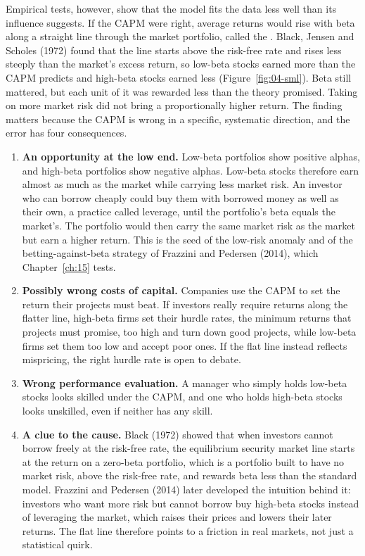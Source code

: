 Empirical tests, however, show that the model fits the data less well than its influence suggests. If the CAPM were right, average returns would rise with beta along a straight line through the market portfolio, called the . Black, Jensen and Scholes (1972) found that the line starts above the risk-free rate and rises less steeply than the market's excess return, so low-beta stocks earned more than the CAPM predicts and high-beta stocks earned less (Figure~\ref{fig:04-sml}). Beta still mattered, but each unit of it was rewarded less than the theory promised. Taking on more market risk did not bring a proportionally higher return. The finding matters because the CAPM is wrong in a specific, systematic direction, and the error has four consequences.

\begin{enumerate}
  \item \textbf{An opportunity at the low end.} Low-beta portfolios show positive alphas, and high-beta portfolios show negative alphas. Low-beta stocks therefore earn almost as much as the market while carrying less market risk. An investor who can borrow cheaply could buy them with borrowed money as well as their own, a practice called leverage, until the portfolio's beta equals the market's. The portfolio would then carry the same market risk as the market but earn a higher return. This is the seed of the low-risk anomaly and of the betting-against-beta strategy of Frazzini and Pedersen (2014), which Chapter~\ref{ch:15} tests.
  \item \textbf{Possibly wrong costs of capital.} Companies use the CAPM to set the return their projects must beat. If investors really require returns along the flatter line, high-beta firms set their hurdle rates, the minimum returns that projects must promise, too high and turn down good projects, while low-beta firms set them too low and accept poor ones. If the flat line instead reflects mispricing, the right hurdle rate is open to debate.
  \item \textbf{Wrong performance evaluation.} A manager who simply holds low-beta stocks looks skilled under the CAPM, and one who holds high-beta stocks looks unskilled, even if neither has any skill.
  \item \textbf{A clue to the cause.} Black (1972) showed that when investors cannot borrow freely at the risk-free rate, the equilibrium security market line starts at the return on a zero-beta portfolio, which is a portfolio built to have no market risk, above the risk-free rate, and rewards beta less than the standard model. Frazzini and Pedersen (2014) later developed the intuition behind it: investors who want more risk but cannot borrow buy high-beta stocks instead of leveraging the market, which raises their prices and lowers their later returns. The flat line therefore points to a friction in real markets, not just a statistical quirk.
\end{enumerate}

